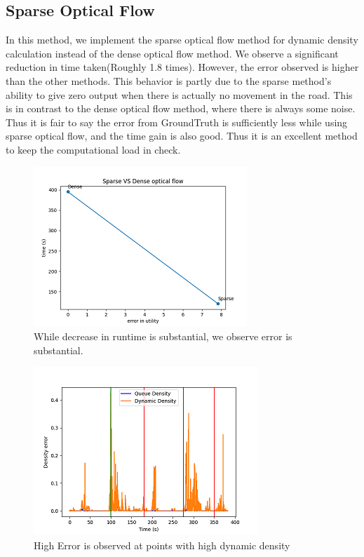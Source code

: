 \documentclass[conference]{IEEEtran}
\begin{document}
\subsection{Sparse Optical Flow}

In this method, we implement the sparse optical flow method for dynamic density calculation instead of the dense optical flow method.
We observe a significant reduction in time taken(Roughly 1.8 times). However, the error observed is higher than the other methods.
This behavior is partly due to the sparse method's ability to give zero output when there is actually no movement in the road. This is in contrast to the dense optical flow method,
where there is always some noise. Thus it is fair to say the error from GroundTruth is sufficiently less while using sparse optical flow, and the time gain is also good. Thus it is an excellent method to keep the computational load in check.

\begin{figure}[htbp]
\centerline{\includegraphics{plots/plot_sparse_optical.png}}
\caption{While decrease in runtime is substantial, we observe error is substantial.}
\label{sof_pvt} 
\end{figure}

\begin{figure}[htbp]
\centerline{\includegraphics{plots/plot_sparse_dense.png}}
\caption{High Error is observed at points with high dynamic density}
\label{sparse_frame_error} 
\end{figure}
\end{document}
